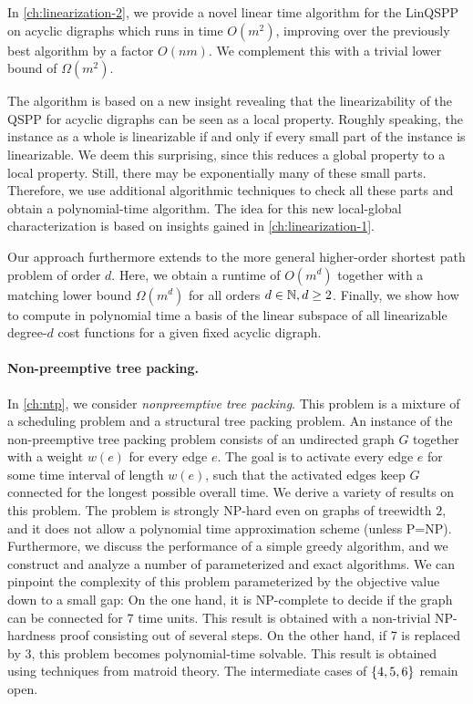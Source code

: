 In \cref{ch:linearization-2}, we provide a novel linear time algorithm for the LinQSPP on acyclic digraphs which runs in time $O(m^2)$, improving over the previously best algorithm by a factor $O(nm)$. We complement this with a trivial lower bound of $\Omega(m^2)$.

The algorithm is based on a new insight revealing that the linearizability of the QSPP for acyclic digraphs can be seen as a local property. Roughly speaking, the instance as a whole is linearizable if and only if every small part of the instance is linearizable. We deem this surprising, since this reduces a global property to a local property. Still, there may be exponentially many of these small parts. Therefore, we use additional algorithmic techniques to check all these parts and obtain a polynomial-time algorithm. The idea for this new local-global characterization is based on insights gained in \cref{ch:linearization-1}.

Our approach furthermore extends to the more general higher-order shortest path problem of order $d$. Here, we obtain a runtime of $O(m^d)$ together with a matching lower bound $\Omega(m^d)$ for all orders $d \in \mathbb{N}, d \geq 2$. 
Finally, we show how to compute in polynomial time a basis of the linear subspace of all linearizable degree-$d$ cost functions for a given fixed acyclic digraph.

\paragraph*{Non-preemptive tree packing.}
In \cref{ch:ntp}, we consider \emph{nonpreemptive tree packing}. This problem is a mixture of a scheduling problem and a structural tree packing problem.
An instance of the non-preemptive tree packing problem consists of an undirected graph $G$ together with a weight $w(e)$ for every edge $e$. The goal is to activate every edge $e$ for some time interval of length $w(e)$, such that the activated edges keep $G$ connected for the longest possible overall time. We derive a variety of results on this problem. The problem is strongly NP-hard even on graphs of treewidth $2$, and it does not allow a polynomial time approximation scheme (unless P=NP). Furthermore, we discuss the performance of a simple greedy algorithm, and we construct and analyze a number of parameterized and exact algorithms.
We can pinpoint the complexity of this problem parameterized by the objective value down to a small gap: On the one hand, it is NP-complete to decide if the graph can be connected for 7 time units. This result is obtained with a non-trivial NP-hardness proof consisting out of several steps. On the other hand, if 7 is replaced by 3, this problem becomes polynomial-time solvable. This result is obtained using techniques from matroid theory. The intermediate cases of $\{ 4,5,6 \}$ remain open.

